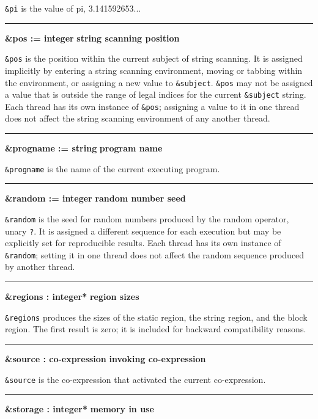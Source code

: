\noindent
{}\texttt{\&pi} is the value of pi, 3.141592653...

\bigskip\hrule\vspace{0.1cm}
\noindent
{\bf \&pos := integer } \hfill {\bf string scanning position}

\noindent
{}\texttt{\&pos} is the position within the
current subject of string scanning. It is assigned implicitly by
entering a string scanning environment, moving or tabbing within the
environment, or assigning a new value to \texttt{\&subject}.
\texttt{\&pos} may not be assigned a value that is outside the range of
legal indices for the current \texttt{\&subject} string.
Each thread has its own instance of
\texttt{\&pos}; \ConcurrencyIssue assigning a value to it in one
thread does not affect the string scanning environment of any another thread.

\bigskip\hrule\vspace{0.1cm}
\noindent
{\bf \&progname := string } \hfill {\bf program name}

\noindent
{}\texttt{\&progname} is the name of the current
executing program.

\bigskip\hrule\vspace{0.1cm}
\noindent
{\bf \&random := integer } \hfill {\bf random number seed}

\noindent
{}\texttt{\&random} is the seed for random
numbers produced by the random operator, unary \texttt{?}. It is
assigned a different sequence for each execution but may be explicitly
set for reproducible results. Each thread has its own instance of
\texttt{\&random}; \ConcurrencyIssue setting it in one thread does
not affect the random sequence produced by another thread.
\bigskip\hrule\vspace{0.1cm}
\noindent
{\bf \&regions : integer* } \hfill {\bf region sizes}

\noindent
{}\texttt{\&regions} produces the sizes of the static
region, the string region, and the block region. The first result is
zero; it is included for backward compatibility reasons.

\bigskip\hrule\vspace{0.1cm}
\noindent
{\bf \&source : co{}-expression } \hfill {\bf invoking co{}-expression}

\noindent
\texttt{\&source} is the co-expression that activated the current
co-expression.

\bigskip\hrule\vspace{0.1cm}
\noindent
{\bf \&storage : integer* } \hfill {\bf memory in use}

